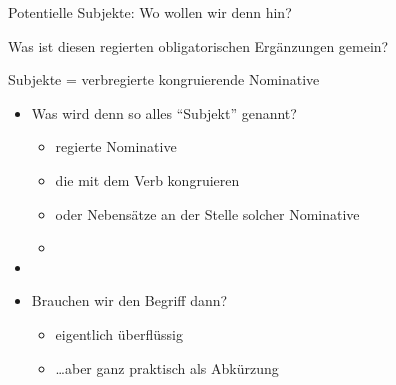 \begin{frame}
  {Potentielle Subjekte: Wo wollen wir denn hin?}
  \pause
  \begin{exe}
    \ex
    \begin{xlist}
      \pause
      \pause
      \pause
      \pause
      \pause
    \end{xlist}
  \end{exe}
  \pause
    Was ist diesen \alert{regierten obligatorischen Ergänzungen} gemein?
\end{frame}

\begin{frame}
  {Subjekte = verbregierte kongruierende Nominative}
  \pause
  \begin{itemize}[<+->]
    \item Was wird denn so alles "`Subjekt"' genannt?
      \begin{itemize}[<+->]
        \item \alert{regierte Nominative}
        \item \alert{die mit dem Verb kongruieren}
        \item oder \alert{Nebensätze} an der Stelle solcher Nominative
        \item {}
      \end{itemize}
      \Halbzeile
    \item {}
      \Halbzeile
    \item Brauchen wir den Begriff dann?
      \begin{itemize}[<+->]
        \item \alert{eigentlich überflüssig}
        \item \ldots aber ganz praktisch als Abkürzung
      \end{itemize}
  \end{itemize}
  \pause
\end{frame}

